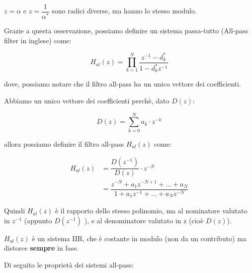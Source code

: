 $z = \alpha$ e $z = \dfrac{1}{\alpha^{*}}$ sono radici diverse, ma hanno lo stesso modulo. \newline 

Grazie a questa osservazione, possiamo definire un sistema passa-tutto (All-pass filter in inglese) come: 

{
    \Large 
    \begin{equation}
        H_{al} \left(z\right) 
        = 
        \prod_{k = 1}^{N} 
        \dfrac{z^{-1} - d_k^{*}}{1 - d_k^{*} z^{-1}}
    \end{equation}
}

dove, possiamo notare che il filtro all-pass ha un unico vettore dei coefficienti. \newline 

\newpage

Abbiamo un unico vettore dei coefficienti perchè, dato $D \left(z \right)$: 

{
    \Large 
    \begin{equation}
        D \left( z\right)
        = 
        \sum_{k = 0 }^{N}
        a_k \cdot z^{-k}
    \end{equation}
}

allora possiamo definire il filtro all-pass $H_{al} \left(z\right)$ come: 

{
    \Large 
    \begin{equation}
        \begin{split}
        H_{al} \left(z\right) 
        &= 
        \dfrac{D \left(z^{-1}\right)}{D \left(z\right)} \cdot z^{-N} 
        \\ 
        &= 
        \dfrac{z^{-N} + a_1 z^{-N + 1} + \dots + a_N}{1 + a_1 z^{-1} + \dots + a_N z^{-N}}    
        \end{split}
    \end{equation}
}

Quindi $H_{al} \left(z\right)$ è il rapporto dello stesso polinomio, ma al nominatore valutato in $z^{-1}$ (appunto $D \left(z^{-1}\right)$ ), 
e al denominatore valutato in z (cioè $D \left(z\right)$). \newline 

$H_{al} \left(z\right)$ è un sistema IIR, che è costante in modulo (non da un contributo) ma distorce \textbf{sempre} in fase. \newline 

Di seguito le proprietà dei sistemi all-pass: 


